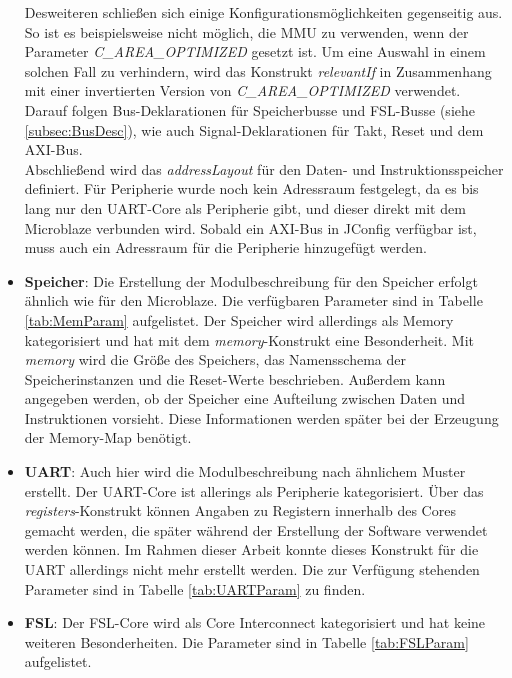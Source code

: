 \begin{itemize}
Desweiteren schließen sich einige Konfigurationsmöglichkeiten gegenseitig aus. So ist es beispielsweise nicht möglich, die MMU zu verwenden, wenn der Parameter \textit{C\_AREA\_OPTIMIZED} gesetzt ist. Um eine Auswahl in einem solchen Fall zu verhindern, wird das Konstrukt \textit{relevantIf} in Zusammenhang mit einer invertierten Version von \textit{C\_AREA\_OPTIMIZED} verwendet.\\
Darauf folgen Bus-Deklarationen für Speicherbusse und FSL-Busse (siehe \ref{subsec:BusDesc}), wie auch Signal-Deklarationen für Takt, Reset und dem AXI-Bus.\\
Abschließend wird das \textit{addressLayout} für den Daten- und Instruktionsspeicher definiert. Für Peripherie wurde noch kein Adressraum festgelegt, da es bis lang nur den UART-Core als Peripherie gibt, und dieser direkt mit dem Microblaze verbunden wird. Sobald ein AXI-Bus in JConfig verfügbar ist, muss auch ein Adressraum für die Peripherie hinzugefügt werden.
\item \textbf{Speicher}: Die Erstellung der Modulbeschreibung für den Speicher erfolgt ähnlich wie für den Microblaze. Die verfügbaren Parameter sind in Tabelle \ref{tab:MemParam} aufgelistet. Der Speicher wird allerdings als Memory kategorisiert und hat mit dem \textit{memory}-Konstrukt eine Besonderheit. Mit \textit{memory} wird die Größe des Speichers, das Namensschema der Speicherinstanzen und die Reset-Werte beschrieben. Außerdem kann angegeben werden, ob der Speicher eine Aufteilung zwischen Daten und Instruktionen vorsieht. Diese Informationen werden später bei der Erzeugung der Memory-Map benötigt.
\item \textbf{UART}: Auch hier wird die Modulbeschreibung nach ähnlichem Muster erstellt. Der UART-Core ist allerings als Peripherie kategorisiert. Über das \textit{registers}-Konstrukt können Angaben zu Registern innerhalb des Cores gemacht werden, die später während der Erstellung der Software verwendet werden können. Im Rahmen dieser Arbeit konnte dieses Konstrukt für die UART allerdings nicht mehr erstellt werden. Die zur Verfügung stehenden Parameter sind in Tabelle \ref{tab:UARTParam} zu finden.
\item \textbf{FSL}: Der FSL-Core wird als Core Interconnect kategorisiert und hat keine weiteren Besonderheiten. Die Parameter sind in Tabelle \ref{tab:FSLParam} aufgelistet.
\end{itemize}

